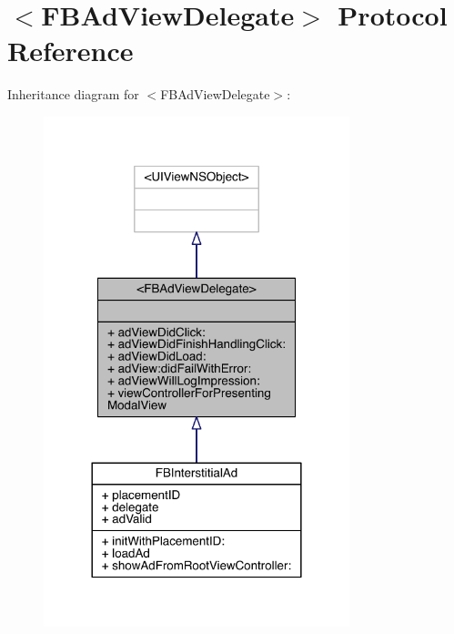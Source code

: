 \hypertarget{protocol_f_b_ad_view_delegate-p}{\section{$<$F\-B\-Ad\-View\-Delegate$>$ Protocol Reference}
\label{protocol_f_b_ad_view_delegate-p}
}


Inheritance diagram for $<$F\-B\-Ad\-View\-Delegate$>$\-:
\nopagebreak
\begin{figure}[H]
\begin{center}
\leavevmode
\includegraphics[width=252pt]{protocol_f_b_ad_view_delegate-p__inherit__graph}
\end{center}
\end{figure}


